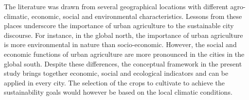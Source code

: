The literature was drawn from several geographical locations with different agro-climatic, economic, social and environmental characteristics. Lessons from these places underscore the importance of urban agriculture to the sustainable city discourse. For instance, in the global north, the importance of urban agriculture is more environmental in nature than socio-economic. However, the social and economic functions of urban agriculture are more pronounced in the cities in the global south. Despite these differences, the conceptual framework in the present study brings together economic, social and ecological indicators and can be applied in every city. The selection of the crops to cultivate to achieve the sustainability goals would however be based on the local climatic conditions.


